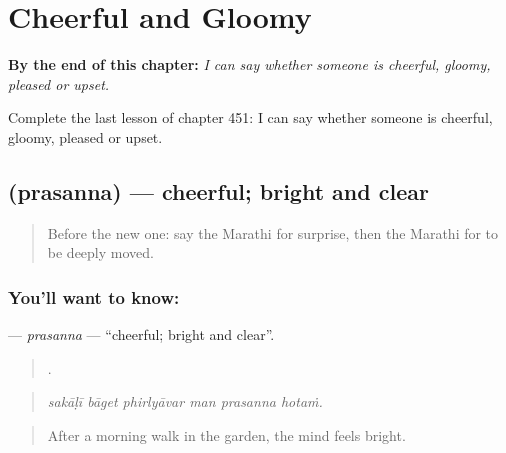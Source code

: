 
\chapter{Cheerful and Gloomy}
\label{ch:mr-cheerful-and-gloomy}

\begin{chapteropening}
\textbf{By the end of this chapter:} \emph{I can say whether someone is cheerful, gloomy, pleased or upset.}

Complete the last lesson of chapter 451: I can say whether someone is cheerful, gloomy, pleased or upset.
\end{chapteropening}

\section[\texorpdfstring{\mr{प्रसन्न} (prasanna)}{प्रसन्न (prasanna)}]{ (prasanna) — cheerful; bright and clear}

\label{lesson:MR-C451-prasanna}



\begin{quote}
Before the new one: say the Marathi for surprise, then the Marathi for to be deeply moved.
\end{quote}

\subsection*{You'll want to know: }
\textbf{} — \emph{prasanna} — \textquotedblleft{}cheerful; bright and clear\textquotedblright{}.

\begin{quote}
     .
\end{quote}

\begin{quote}
\emph{sakāḷī bāget phirlyāvar man prasanna hotaṁ.}
\end{quote}

\begin{quote}
After a morning walk in the garden, the mind feels bright.
\end{quote}

